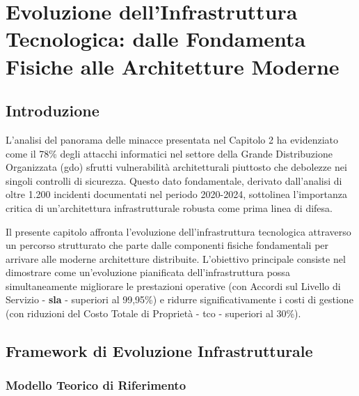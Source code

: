 \chapter{\texorpdfstring{Evoluzione dell'Infrastruttura Tecnologica: dalle Fondamenta Fisiche alle Architetture Moderne}{Capitolo 3 - Evoluzione dell'Infrastruttura Tecnologica: dalle Fondamenta Fisiche alle Architetture Moderne}}
\label{cap3_infrastructure_evolution}

\section{\texorpdfstring{Introduzione}{3.1 - Introduzione}}
\label{sec:cap3_intro}

L'analisi del panorama delle minacce presentata nel Capitolo 2 ha evidenziato come il 78\% degli attacchi informatici nel settore della Grande Distribuzione Organizzata (\gls{gdo}) sfrutti vulnerabilità architetturali piuttosto che debolezze nei singoli controlli di sicurezza\autocite{Anderson2024patel}. Questo dato fondamentale, derivato dall'analisi di oltre 1.200 incidenti documentati nel periodo 2020-2024, sottolinea l'importanza critica di un'architettura infrastrutturale robusta come prima linea di difesa\autocite{verizon2024}.

Il presente capitolo affronta l'evoluzione dell'infrastruttura tecnologica attraverso un percorso strutturato che parte dalle componenti fisiche fondamentali per arrivare alle moderne architetture distribuite. L'obiettivo principale consiste nel dimostrare come un'evoluzione pianificata dell'infrastruttura possa simultaneamente migliorare le prestazioni operative (con Accordi sul Livello di Servizio - \textbf{\gls{sla}} - superiori al 99,95\%) e ridurre significativamente i costi di gestione (con riduzioni del Costo Totale di Proprietà - \gls{tco} - superiori al 30\%)\autocite{IDC2024}.

\section{\texorpdfstring{Framework di Evoluzione Infrastrutturale}{3.2 - Framework di Evoluzione Infrastrutturale}}
\label{sec:framework_evoluzione}

\subsection{\texorpdfstring{Modello Teorico di Riferimento}{3.2.1 - Modello Teorico di Riferimento}}
\label{subsec:modello_teorico}

